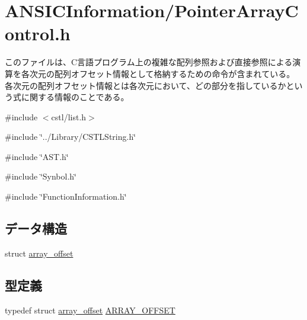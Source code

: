 \section{ANSICInformation/PointerArrayControl.h}
\label{PointerArrayControl_8h}


このファイルは、C言語プログラム上の複雑な配列参照および直接参照による演算を各次元の配列オフセット情報として格納するための命令が含まれている。 各次元の配列オフセット情報とは各次元において、どの部分を指しているかという式に関する情報のことである。  


{\ttfamily \#include $<$cstl/list.h$>$}\par
{\ttfamily \#include \char`\"{}../Library/CSTLString.h\char`\"{}}\par
{\ttfamily \#include \char`\"{}AST.h\char`\"{}}\par
{\ttfamily \#include \char`\"{}Synbol.h\char`\"{}}\par
{\ttfamily \#include \char`\"{}FunctionInformation.h\char`\"{}}\par
\subsection*{データ構造}
\begin{DoxyCompactItemize}
\item 
struct \hyperlink{structarray__offset}{array\_\-offset}
\end{DoxyCompactItemize}
\subsection*{型定義}
\begin{DoxyCompactItemize}
\item 
typedef struct \hyperlink{structarray__offset}{array\_\-offset} \hyperlink{PointerArrayControl_8h_ae18d261788d71423fa2c0980d3de19cd}{ARRAY\_\-OFFSET}
\end{DoxyCompactItemize}

